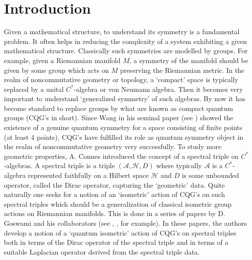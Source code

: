 \documentclass{amsart}
\theoremstyle{plain}
\theoremstyle{definition}
\theoremstyle{remark}
\numberwithin{equation}{section}
\newcommand{\cal}{\mathcal}
\newcommand{\cla}{{\cal A}}
\newcommand{\clh}{{\cal H}}
\begin{document}
\section{Introduction}
Given a mathematical structure, to understand its symmetry is a fundamental problem. It often helps in reducing the complexity of a system exhibiting a given mathematical structure. Classically such symmetries are modelled by groups. For example, given a Riemannian manifold $M$, a symmetry of the manifold should be given by some group which acts on $M$ preserving the Riemannian metric. In the realm of noncommutative geometry or topology, a `compact' space is typically replaced by a unital $C^{\ast}$-algebra or von Neumann algebra. Then it becomes very important to understand `generalized symmetry' of such algebras. By now it has become standard to replace groups by what are known as compact quantum groups (CQG's in short). Since Wang in his seminal paper (see \cite{wang}) showed the existence of a genuine quantum symmetry for a space consisting of finite points (at least 4 points), CQG's have fulfilled its role as quantum symmetry object in the realm of noncommutative geometry very successfully. To study more geometric properties, A. Connes introduced the concept of a spectral triple on $C^{\ast}$-algebras. A spectral triple is a triple $(\cla,\clh,D)$ where typically $\cla$ is a $C^{\ast}$-algebra represented faithfully on a Hilbert space $\clh$ and $D$ is some unbounded operator, called the Dirac operator, capturing the `geometric' data. Quite naturally one seeks for a notion of an `isometric' action of CQG's on such spectral triples which should be a generalization of classical isometric group actions on Riemannian manifolds. This is done in a series of papers by D. Goswami and his collaborators (see \cite{goswami1}, \cite{goswami2}, \cite{goswami3} for example). In these papers, the authors develop a notion of a `quantum isometric' action of CQG's on spectral triples both in terms of the Dirac operator of the spectral triple and in terms of a suitable Laplacian operator derived from the spectral triple data. \\
\end{document}
